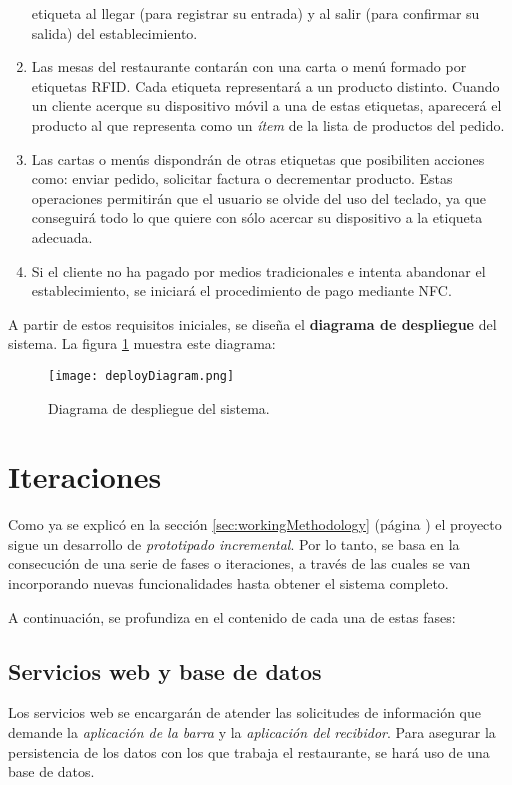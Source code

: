 \begin{enumerate}
etiqueta al llegar (para registrar su entrada) y al salir (para confirmar
su salida) del establecimiento.
\item Las mesas del restaurante contarán con una carta o menú formado por
etiquetas \acs{RFID}. Cada etiqueta representará a un producto distinto.
Cuando un cliente acerque su dispositivo móvil a una de estas etiquetas,
aparecerá el producto al que representa como un \emph{ítem} de la lista de
productos del pedido.
\item Las cartas o menús dispondrán de otras etiquetas que posibiliten acciones
como: enviar pedido, solicitar factura o decrementar producto. Estas
operaciones permitirán que el usuario se olvide del uso del teclado, ya que
conseguirá todo lo que quiere con sólo acercar su dispositivo a la etiqueta
adecuada.
\item Si el cliente no ha pagado por medios tradicionales e intenta abandonar
el establecimiento, se iniciará el procedimiento de pago mediante \acs{NFC}.
\end{enumerate}

A partir de estos requisitos iniciales, se diseña el \textbf{diagrama de
despliegue} del sistema. La figura \ref{fig:deployDiagram} muestra este 
diagrama:

  \begin{figure}[h]
    \begin{center}
      \texttt{[image: deployDiagram.png]}
      \caption{Diagrama de despliegue del sistema.}
      \label{fig:deployDiagram}
    \end{center}
  \end{figure}

\section{Iteraciones}
Como ya se explicó en la sección \ref{sec:workingMethodology} (página
\pageref{sec:workingMethodology}) el proyecto sigue un desarrollo de
\emph{prototipado incremental}. Por lo tanto, se basa en la consecución de una
serie de fases o iteraciones, a través de las cuales se van incorporando nuevas
funcionalidades hasta obtener el sistema completo.

A continuación, se profundiza en el contenido de cada una de estas fases:

\subsection{Servicios web y base de datos}
Los servicios web se encargarán de atender las solicitudes de información que
demande la \emph{aplicación de la barra} y la \emph{aplicación del recibidor}.
Para asegurar la persistencia de los datos con los que trabaja el restaurante,
se hará uso de una base de datos.

